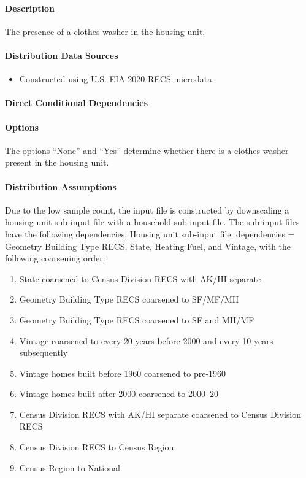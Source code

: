 \paragraph{Description}
% 
The presence of a clothes washer in the housing unit.

\paragraph{Distribution Data Sources}
% 
\begin{itemize}
\item 
Constructed using U.S. EIA 2020 RECS microdata. 
\end{itemize}

\paragraph{Direct Conditional Dependencies}


\paragraph{Options}
The options ``None'' and ``Yes'' determine whether there is a clothes washer present in the housing unit.

\paragraph{Distribution Assumptions}
% 
Due to the low sample count, the input file is constructed by downscaling a housing unit sub-input file with a household sub-input file. The sub-input files have the following dependencies. Housing unit sub-input file: dependencies = Geometry Building Type RECS, State, Heating Fuel, and Vintage, with the following coarsening order:
\begin{enumerate}
    \item State coarsened to Census Division RECS with AK/HI separate
    \item  Geometry Building Type RECS coarsened to SF/MF/MH
    \item  Geometry Building Type RECS coarsened to SF and MH/MF 
    \item  Vintage coarsened to every 20 years before 2000 and every 10 years subsequently
    \item Vintage homes built before 1960 coarsened to pre-1960 
    \item  Vintage homes built after 2000 coarsened to 2000--20
    \item Census Division RECS with AK/HI separate coarsened to Census Division RECS 
    \item Census Division RECS to Census Region
    \item Census Region to National. 
\end{enumerate}

